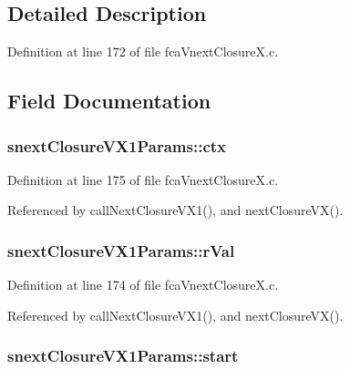 \subsection{\-Detailed \-Description}


\-Definition at line 172 of file fca\-Vnext\-Closure\-X.\-c.



\subsection{\-Field \-Documentation}
\hypertarget{structsnextClosureVX1Params_af00ec23c26d8b4e217d29e5b949f285d}{
\subsubsection[{ctx}]{ {\bf snext\-Closure\-V\-X1\-Params\-::ctx}}}\label{structsnextClosureVX1Params_af00ec23c26d8b4e217d29e5b949f285d}


\-Definition at line 175 of file fca\-Vnext\-Closure\-X.\-c.



\-Referenced by call\-Next\-Closure\-V\-X1(), and next\-Closure\-V\-X().

\hypertarget{structsnextClosureVX1Params_a6cdec21a24ddae482ae521f8c560703a}{
\subsubsection[{r\-Val}]{ {\bf snext\-Closure\-V\-X1\-Params\-::r\-Val}}}\label{structsnextClosureVX1Params_a6cdec21a24ddae482ae521f8c560703a}


\-Definition at line 174 of file fca\-Vnext\-Closure\-X.\-c.



\-Referenced by call\-Next\-Closure\-V\-X1(), and next\-Closure\-V\-X().

\hypertarget{structsnextClosureVX1Params_a61ba68899ccb6dff43b95531868f5093}{
\subsubsection[{start}]{ {\bf snext\-Closure\-V\-X1\-Params\-::start}}}\label{structsnextClosureVX1Params_a61ba68899ccb6dff43b95531868f5093}


